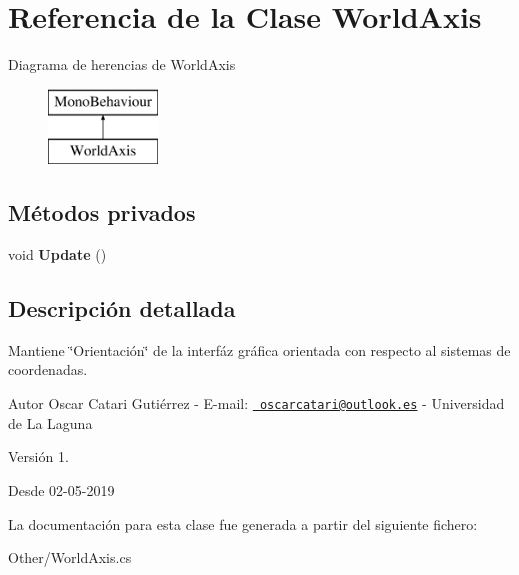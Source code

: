 \hypertarget{class_world_axis}{}\section{Referencia de la Clase World\+Axis}
\label{class_world_axis}
Diagrama de herencias de World\+Axis\begin{figure}[H]
\begin{center}
\leavevmode
\includegraphics[height=2.000000cm]{class_world_axis}
\end{center}
\end{figure}
\subsection*{Métodos privados}
\begin{DoxyCompactItemize}
\item 
\mbox{\label{class_world_axis_a117b9971cb01008a0b0cef393b2abb3b}} 
void {\bfseries Update} ()
\end{DoxyCompactItemize}


\subsection{Descripción detallada}
Mantiene \char`\"{}\+Orientación\char`\"{} de la interfáz gráfica orientada con respecto al sistemas de coordenadas. \begin{DoxyAuthor}{Autor}
Oscar Catari Gutiérrez -\/ E-\/mail\+: \href{mailto:oscarcatari@outlook.es}{\texttt{ oscarcatari@outlook.\+es}} -\/ Universidad de La Laguna 
\end{DoxyAuthor}
\begin{DoxyVersion}{Versión}
1. 
\end{DoxyVersion}
\begin{DoxySince}{Desde}
02-\/05-\/2019 
\end{DoxySince}


La documentación para esta clase fue generada a partir del siguiente fichero\+:\begin{DoxyCompactItemize}
\item 
Other/World\+Axis.\+cs\end{DoxyCompactItemize}
